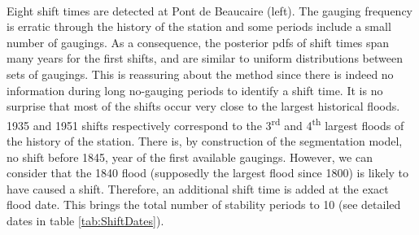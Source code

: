 \documentclass[11pt]{article}
\begin{document}
    \paragraph{}
    Eight shift times are detected at Pont de Beaucaire (left). The gauging frequency is erratic through the history of the station and some periods include a small number of gaugings. As a consequence, the posterior pdfs of shift times span many years for the first shifts, and are similar to uniform distributions between sets of gaugings. This is reassuring about the method since there is indeed no information during long no-gauging periods to identify a shift time. It is no surprise that most of the shifts occur very close to the largest historical floods. 1935 and 1951 shifts respectively correspond to the 3\textsuperscript{rd} and 4\textsuperscript{th} largest floods of the history of the station. There is, by construction of the segmentation model, no shift before 1845, year of the first available gaugings. However, we can consider that the 1840 flood (supposedly the largest flood since 1800) is likely to have caused a shift. Therefore, an additional shift time is added at the exact flood date. This brings the total number of stability periods to 10 (see detailed dates in table \ref{tab:ShiftDates}). 
    
\end{document}
